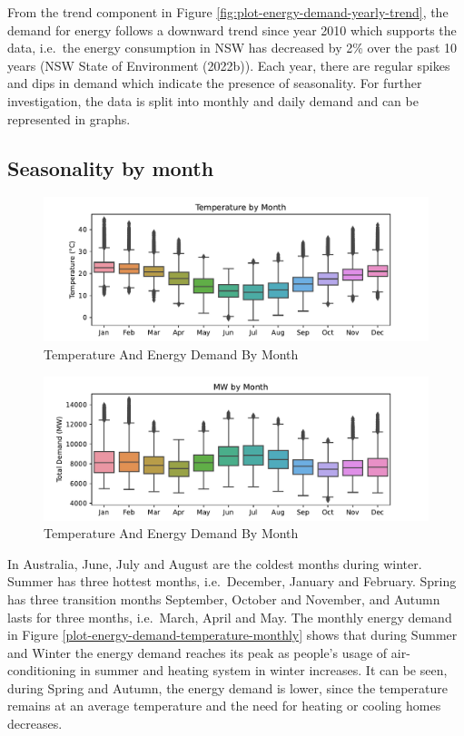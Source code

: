 \documentclass[mstat,12pt]{unswthesis}
\begin{document}
From the trend component in Figure
\ref{fig:plot-energy-demand-yearly-trend}, the demand for energy follows
a downward trend since year 2010 which supports the data, i.e.~the
energy consumption in NSW has decreased by 2\% over the past 10 years
(NSW State of Environment (2022b)). Each year, there are regular spikes
and dips in demand which indicate the presence of seasonality. For
further investigation, the data is split into monthly and daily demand
and can be represented in graphs.

\hypertarget{seasonality-by-month}{%
\subsection{Seasonality by month}\label{seasonality-by-month}}

\begin{figure}[H]
\includegraphics[width=1\linewidth,]{ZZSC9020_Group_Report_files/figure-latex/plot-energy-demand-temperature-monthly-3} \caption{Temperature And Energy Demand By Month}\label{fig:plot-energy-demand-temperature-monthly}
\end{figure}
\begin{figure}[H]
\includegraphics[width=1\linewidth,]{ZZSC9020_Group_Report_files/figure-latex/plot-energy-demand-temperature-monthly-4} \caption{Temperature And Energy Demand By Month}\label{fig:plot-energy-demand-temperature-monthly}
\end{figure}

In Australia, June, July and August are the coldest months during
winter. Summer has three hottest months, i.e.~December, January and
February. Spring has three transition months September, October and
November, and Autumn lasts for three months, i.e.~March, April and May.
The monthly energy demand in Figure
\ref{plot-energy-demand-temperature-monthly} shows that during Summer
and Winter the energy demand reaches its peak as people's usage of
air-conditioning in summer and heating system in winter increases. It
can be seen, during Spring and Autumn, the energy demand is lower, since
the temperature remains at an average temperature and the need for
heating or cooling homes decreases.
\end{document}

